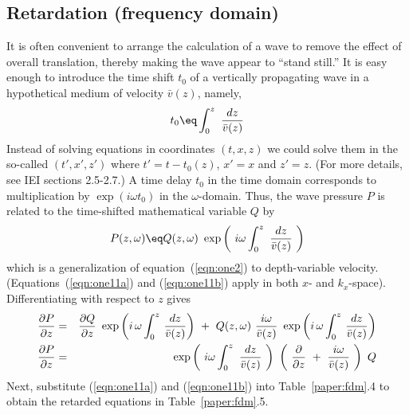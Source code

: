 {\subsection{Retardation (frequency domain)}
\par
It is often convenient to arrange the calculation of a wave
to remove the effect of overall translation,
thereby making the wave appear to ``stand still.''
It is easy enough to introduce
the time shift  $t_0$  of a vertically propagating wave
in a hypothetical medium of velocity  $ \bar v ( z )$, namely,
\begin{equation}
t_0  \eq  \int_0^z \  { dz   \over  \bar v (z) }
\label{eqn:one10}
\end{equation}
Instead of solving equations in coordinates $(t,x,z)$
we could solve them in the so-called 
$(t',x',z')$ where
$t'=t-t_0(z)$, $x'=x$ and $z'=z$.
(For more details, see IEI sections 2.5-2.7.)
A time delay  $t_0$  in
the time domain corresponds to multiplication
by  $\exp ( i \omega t_0 )$  in the  $\omega$-domain.
Thus, the wave pressure $P$  is related
to the time-shifted mathematical variable  $Q$  by
\begin{equation}
P(z, \omega )  \eq 
Q(z, \omega ) \  \exp
\left( \  i \omega \int_0^z \  {dz \over  \bar v (z)} \  \right)
\label{eqn:one11a}
\end{equation}
which is a generalization of equation~(\ref{eqn:one2})
to depth-variable velocity.
(Equations~(\ref{eqn:one11a}) and (\ref{eqn:one11b}) apply in both $x$- and
$k_x$-space).
Differentiating with respect to  $z$  gives
\begin{eqnarray}
{\partial P \over \partial z } &=& { \partial Q   \over  \partial z } \ 
\exp \left(  i\, \omega  \int_0^z \,  {dz \over  \bar v (z) }
\right) \ +\ 
Q(z, \omega ) \  { i \omega   \over  \bar v (z) }
\  \exp \left(  i\, \omega  \int_0^z \, {dz \over  \bar v (z) }  \right)
\\
{\partial P   \over \partial z}  &=&
\exp \left( \  i \omega  \int_0^z \  {dz \over  \bar v (z) } \  \right)
\  \left( \  {\partial \over \partial z} \ +\ 
{ i \omega   \over  \bar v (z) } \  \right) \  Q
\label{eqn:one11b}
\end{eqnarray}
Next, substitute (\ref{eqn:one11a}) and (\ref{eqn:one11b})
into Table~\ref{paper:fdm}.4
to obtain the retarded equations in Table~\ref{paper:fdm}.5.
\begin{table}
\begin{center}
\begin{tabular}{|r|ll|}     \hline

\end{tabular}
\end{center}
\end{table}}
